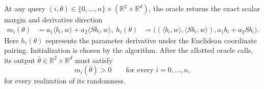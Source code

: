\documentclass[10pt]{article}
\theoremstyle{definition}
\begin{document}
At any query $(i,\theta)\in\{0,\ldots,n\}\times(\mathbb{R}^2\times\mathbb{R}^d)$, the oracle returns the exact scalar margin and derivative direction
\[
\begin{aligned}
m_i(\theta)&=a_1\langle b_i,w\rangle
                 +a_2\langle Sb_i,w\rangle,\
h_i(\theta)&=\bigl((\langle b_i,w\rangle,\langle Sb_i,w\rangle),
                    a_1b_i+a_2Sb_i\bigr).
\end{aligned}
\]
Here $h_i(\theta)$ represents the parameter derivative under the Euclidean coordinate pairing. Initialization is chosen by the algorithm. After the allotted oracle calls, its output $\bar{\theta}\in\mathbb{R}^2\times\mathbb{R}^d$ must satisfy
\[
m_i(\bar{\theta})>0
\qquad\text{for every }i=0,\ldots,n,
\]
for every realization of its randomness.
\end{document}
